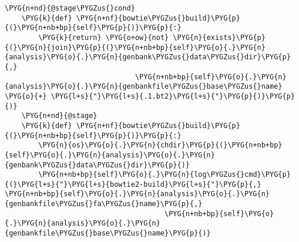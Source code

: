 \begin{Verbatim}[commandchars=\\\{\}]
    \PYG{n+nd}{@stage\PYGZus{}cond}
    \PYG{k}{def} \PYG{n+nf}{bowtie\PYGZus{}build}\PYG{p}{(}\PYG{n+nb+bp}{self}\PYG{p}{)}\PYG{p}{:}
        \PYG{k}{return} \PYG{o+ow}{not} \PYG{n}{exists}\PYG{p}{(}\PYG{n}{join}\PYG{p}{(}\PYG{n+nb+bp}{self}\PYG{o}{.}\PYG{n}{analysis}\PYG{o}{.}\PYG{n}{genbank\PYGZus{}data\PYGZus{}dir}\PYG{p}{,}
                               \PYG{n+nb+bp}{self}\PYG{o}{.}\PYG{n}{analysis}\PYG{o}{.}\PYG{n}{genbankfile\PYGZus{}base\PYGZus{}name} \PYG{o}{+} \PYG{l+s}{"}\PYG{l+s}{.1.bt2}\PYG{l+s}{"}\PYG{p}{)}\PYG{p}{)}
    \PYG{n+nd}{@stage}
    \PYG{k}{def} \PYG{n+nf}{bowtie\PYGZus{}build}\PYG{p}{(}\PYG{n+nb+bp}{self}\PYG{p}{)}\PYG{p}{:}
        \PYG{n}{os}\PYG{o}{.}\PYG{n}{chdir}\PYG{p}{(}\PYG{n+nb+bp}{self}\PYG{o}{.}\PYG{n}{analysis}\PYG{o}{.}\PYG{n}{genbank\PYGZus{}data\PYGZus{}dir}\PYG{p}{)}
        \PYG{n+nb+bp}{self}\PYG{o}{.}\PYG{n}{log\PYGZus{}cmd}\PYG{p}{(}\PYG{l+s}{"}\PYG{l+s}{bowtie2-build}\PYG{l+s}{"}\PYG{p}{,} \PYG{n+nb+bp}{self}\PYG{o}{.}\PYG{n}{analysis}\PYG{o}{.}\PYG{n}{genbankfile\PYGZus{}fa\PYGZus{}name}\PYG{p}{,}
                                      \PYG{n+nb+bp}{self}\PYG{o}{.}\PYG{n}{analysis}\PYG{o}{.}\PYG{n}{genbankfile\PYGZus{}base\PYGZus{}name}\PYG{p}{)}


\end{Verbatim}
